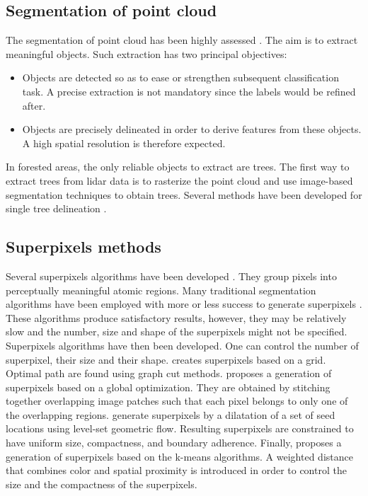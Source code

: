 \subsection{Segmentation of point cloud}
The segmentation of point cloud has been highly assessed \citep{nguyen20133d}. The aim is to extract meaningful objects. Such extraction has two principal objectives:
\begin{itemize}
\item Objects are detected so as to ease or strengthen subsequent classification task. A precise extraction is not mandatory since the labels would be refined after.
\item Objects are precisely delineated in order to derive features from these objects. A high spatial resolution is therefore expected.
\end{itemize}

In forested areas, the only reliable objects to extract are trees. The first way to extract trees from lidar data is to rasterize the point cloud and use image-based segmentation techniques to obtain trees. Several methods have been developed for single tree delineation \citep{dalponte2014tree, vega2014ptrees, kandare2014new}. 

\subsection{Superpixels methods}
Several superpixels algorithms have been developed \citep{achanta2012slic}. They group pixels into perceptually meaningful atomic regions. Many traditional segmentation algorithms have been employed with more or less success to generate superpixels \citep{shi2000normalized, felzenszwalb2004efficient, comaniciu2002mean, vedaldi2008quick, vincent1991watersheds}. These algorithms produce satisfactory results, however, they may be relatively slow and the number, size and shape of the superpixels might not be specified. \\

Superpixels algorithms have then been developed. One can control the number of superpixel, their size and their shape. \cite{moore2008superpixel} creates superpixels based on a grid. Optimal path are found using graph cut methods. \cite{veksler2010superpixels} proposes a generation of superpixels based on a global optimization. They are obtained by stitching together overlapping image patches such that each pixel belongs to only one of the overlapping regions. \cite{levinshtein2009turbopixels} generate superpixels by a dilatation of a set of seed locations using level-set geometric flow. Resulting superpixels are constrained to have uniform size, compactness, and boundary adherence. Finally, \cite{achanta2012slic} proposes a generation of superpixels based on the k-means algorithms. A weighted distance that combines color and spatial proximity is introduced in order to control the size and the compactness of the superpixels.

